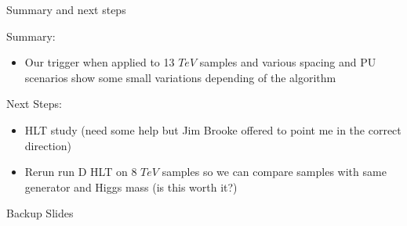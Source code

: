 \documentclass[8pt]{beamer}
\begin{document}
\begin{frame}{Summary and next steps}
 
\begin{block}{Summary:}
 
\begin{itemize}
  \item Our trigger when applied to 13 $TeV$ samples and various spacing and PU scenarios show some small variations depending of the algorithm
\end{itemize}

\end{block}

\begin{block}{Next Steps:}
 
\begin{itemize}
  \item HLT study (need some help but Jim Brooke offered to point me in the correct direction)
  \item Rerun run D HLT on 8 $TeV$ samples so we can compare samples with same generator and Higgs mass (is this worth it?) 
\end{itemize}
 
\end{block}

\end{frame}


\appendix
\begin{frame}
 
\begin{block}

\begin{center}Backup Slides\end{center}

\end{block}

\end{frame}
\end{document}
